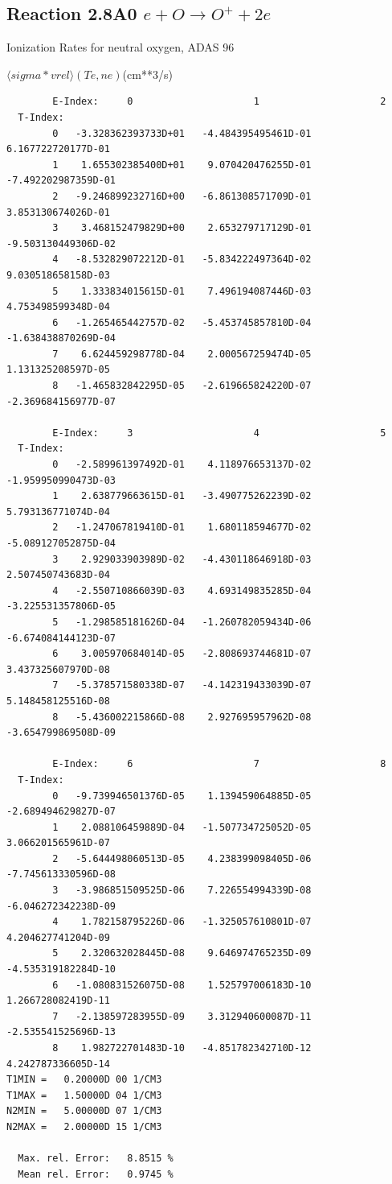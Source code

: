 \documentclass[12pt,dvipdfmx]{article}
\begin{document}
\subsection{
Reaction 2.8A0 $e + O \rightarrow O^+  + 2e $ }
  Ionization Rates for neutral  oxygen,   ADAS 96

$  \langle sigma*vrel \rangle(Te,ne) $(cm**3/s)
\begin{small}\begin{verbatim}
        E-Index:     0                     1                     2
  T-Index:
        0   -3.328362393733D+01   -4.484395495461D-01    6.167722720177D-01
        1    1.655302385400D+01    9.070420476255D-01   -7.492202987359D-01
        2   -9.246899232716D+00   -6.861308571709D-01    3.853130674026D-01
        3    3.468152479829D+00    2.653279717129D-01   -9.503130449306D-02
        4   -8.532829072212D-01   -5.834222497364D-02    9.030518658158D-03
        5    1.333834015615D-01    7.496194087446D-03    4.753498599348D-04
        6   -1.265465442757D-02   -5.453745857810D-04   -1.638438870269D-04
        7    6.624459298778D-04    2.000567259474D-05    1.131325208597D-05
        8   -1.465832842295D-05   -2.619665824220D-07   -2.369684156977D-07

        E-Index:     3                     4                     5
  T-Index:
        0   -2.589961397492D-01    4.118976653137D-02   -1.959950990473D-03
        1    2.638779663615D-01   -3.490775262239D-02    5.793136771074D-04
        2   -1.247067819410D-01    1.680118594677D-02   -5.089127052875D-04
        3    2.929033903989D-02   -4.430118646918D-03    2.507450743683D-04
        4   -2.550710866039D-03    4.693149835285D-04   -3.225531357806D-05
        5   -1.298585181626D-04   -1.260782059434D-06   -6.674084144123D-07
        6    3.005970684014D-05   -2.808693744681D-07    3.437325607970D-08
        7   -5.378571580338D-07   -4.142319433039D-07    5.148458125516D-08
        8   -5.436002215866D-08    2.927695957962D-08   -3.654799869508D-09

        E-Index:     6                     7                     8
  T-Index:
        0   -9.739946501376D-05    1.139459064885D-05   -2.689494629827D-07
        1    2.088106459889D-04   -1.507734725052D-05    3.066201565961D-07
        2   -5.644498060513D-05    4.238399098405D-06   -7.745613330596D-08
        3   -3.986851509525D-06    7.226554994339D-08   -6.046272342238D-09
        4    1.782158795226D-06   -1.325057610801D-07    4.204627741204D-09
        5    2.320632028445D-08    9.646974765235D-09   -4.535319182284D-10
        6   -1.080831526075D-08    1.525797006183D-10    1.266728082419D-11
        7   -2.138597283955D-09    3.312940600087D-11   -2.535541525696D-13
        8    1.982722701483D-10   -4.851782342710D-12    4.242787336605D-14
T1MIN =   0.20000D 00 1/CM3
T1MAX =   1.50000D 04 1/CM3
N2MIN =   5.00000D 07 1/CM3
N2MAX =   2.00000D 15 1/CM3

  Max. rel. Error:   8.8515 %
  Mean rel. Error:   0.9745 %


\end{verbatim}\end{small}
\end{document}

